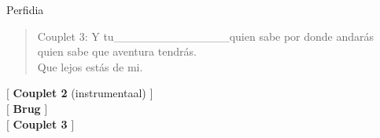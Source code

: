 \begin{song}[bolero]{Perfidia}
\begin{verse}{Couplet 3:}
Y\hspace{1em} tu\_{}\_{}\_{}\_{}\_{}\_{}\_{}\_{}\_{}\_{}\_{}\_{}\_{}\_{}quien sabe por donde andar\'{a}s \hspace{3em}\\
quien sabe que aventura tendr\'{a}s.\\
Que lejos est\'{a}s de mi. \hspace{3em} \hspace{3em} \hspace{3em}
\end{verse}

$[$ \textbf{Couplet 2} (instrumentaal) $]$\\
$[$ \textbf{Brug} $]$\\
$[$ \textbf{Couplet 3} $]$
\end{song}
